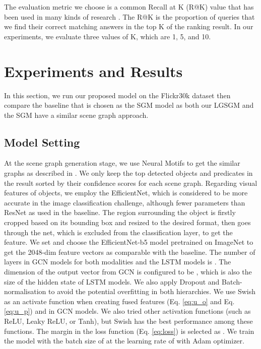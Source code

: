 \documentclass{IOS-Book-Article}
\begin{document}
The evaluation metric we choose is a common Recall at K (R@K) value that has been used in many kinds of research \cite{wang2020cross,wang2019position,chen2020imram,wei2020multi}. The R@K is the proportion of queries that we find their correct matching answers in the top K of the ranking result. In our experiments, we evaluate three values of K, which are 1, 5, and 10.

\section{Experiments and Results}
In this section, we run our proposed model on the Flickr30k dataset then compare the baseline that is chosen as the SGM model as both our LGSGM and the SGM have a similar scene graph approach.

\subsection{Model Setting}
At the scene graph generation stage, we use Neural Motifs \cite{motifnet} 
to get the similar graphs as described in \cite{wang2020cross}. We only keep the top  detected objects and  predicates in the result sorted by their confidence scores for each scene graph. Regarding visual features of objects, we employ the EfficientNet, which is considered to be more accurate in the image classification challenge, although fewer parameters \cite{tan2019efficientnet} than ResNet \cite{he2016deep} as used in the baseline. The region surrounding the object is firstly cropped based on its bounding box and resized to the desired format, then goes through the net, which is excluded from the classification layer, to get the feature. We set  and choose the EfficientNet-b5 model pretrained on ImageNet to get the 2048-dim feature vectors as comparable with the baseline. The number of layers in GCN models for both modalities and the LSTM models is . The dimension of the output vector from GCN is configured to be , which is also the size of the hidden state of LSTM models. We also apply Dropout and Batch-normalisation to avoid the potential overfitting in both hierarchies. We use Swish \cite{ramachandran2017searching} as an activate function when creating fused features (Eq. \ref{eq:u_o} and Eq. \ref{eq:u_p}) and in GCN models. We also tried other activation functions (such as ReLU, Leaky ReLU, or Tanh), but Swish has the best performance among these functions. The margin  in the loss function (Eq. \ref{eq:loss}) is selected as . We train the model with the batch size of  at the learning rate of  with Adam optimizer. 
\end{document}
